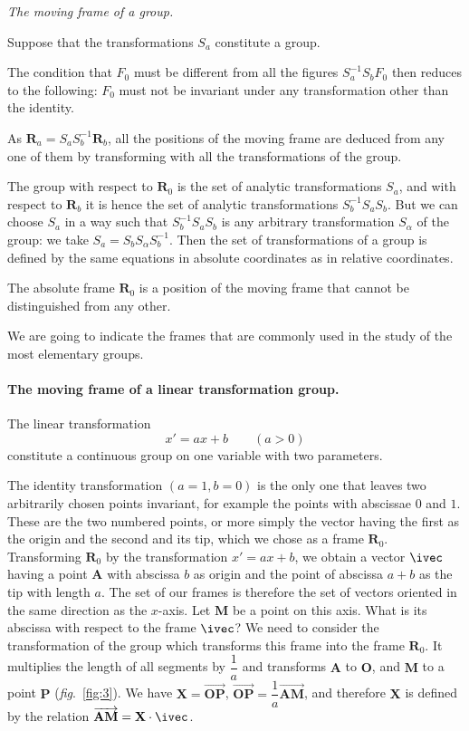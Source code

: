 \somespace

\emph{The moving frame of a group.}

\somespace

Suppose that the transformations $S_{a}$ constitute a group.

The condition that $F_{0}$ must be different from all the figures $S_{a}^{-1}S_{b}F_{0}$ then reduces to the following: $F_{0}$ must not be invariant under any transformation other than the identity.

As $\mathbf{R}_{a}=S_{a}S_{b}^{-1}\mathbf{R}_{b}$, all the positions of the moving frame are deduced from any one of them by transforming with all the transformations of the group.

The group with respect to $\mathbf{R}_{0}$ is the set of analytic transformations $S_{a}$, and with respect to $\mathbf{R}_{b}$ it is hence the set of analytic transformations $S_{b}^{-1}S_{a}S_{b}$. But we can choose $S_{a}$ in a way such that $S_{b}^{-1}S_{a}S_{b}$ is any arbitrary transformation $S_{\alpha}$ of the group: we take $S_{a}=S_{b}S_{\alpha}S_{b}^{-1}$. Then the set of transformations of a group is defined by the same equations in absolute coordinates as in relative coordinates.

The absolute frame $\mathbf{R}_{0}$ is a position of the moving frame that cannot be distinguished from any other.

We are going to indicate the frames that are commonly used in the study of the most elementary groups.

\paragraph{The moving frame of a linear transformation group.}
\label{sec:64}
The linear transformation\[
x'=ax+b\qquad(a>0)
\]
constitute a continuous group on one variable with two parameters.

The identity transformation $(a=1,b=0)$ is the only one that leaves two arbitrarily chosen points invariant, for example the points with abscissae $0$ and $1$. These are the two numbered points, or more simply the vector having the first as the origin and the second and its tip, which we chose as a frame $\mathbf{R}_{0}$. Transforming $\mathbf{R}_{0}$ by the transformation $x'=ax+b$, we obtain a vector $\ivec$ having a point $\mathbf{A}$ with abscissa $b$ as origin and the point of abscissa $a+b$ as the tip with length $a$. The set of our frames is therefore the set of vectors oriented in the same direction as the $x$-axis. Let $\mathbf{M}$ be a point on this axis. What is its abscissa with respect to the frame $\ivec$? We need to consider the transformation of the group which transforms this frame into the frame $\mathbf{R}_{0}$. It multiplies the length of all segments by $\dfrac{1}{a}$ and transforms $\mathbf{A}$ to $\mathbf{O}$, and $\mathbf{M}$ to a point $\mathbf{P}$ (\emph{fig}.~\ref{fig:3}). We have $\mathbf{X}=\overrightarrow{\mathbf{OP}}$, $\overrightarrow{\mathbf{\mathbf{OP}}}=\dfrac{1}{a}\overrightarrow{\mathbf{AM}}$, and therefore $\mathbf{X}$ is defined by the relation $\overrightarrow{\mathbf{AM}}=\mathbf{X}\cdot\ivec$.

